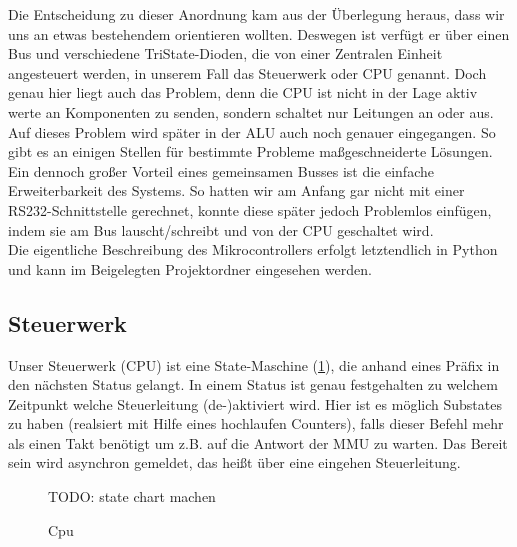 Die Entscheidung zu dieser Anordnung kam aus der Überlegung heraus, dass wir uns an etwas bestehendem orientieren wollten. Deswegen ist verfügt er über einen Bus und verschiedene TriState-Dioden, die von einer Zentralen Einheit angesteuert werden, in unserem Fall das Steuerwerk oder CPU genannt. Doch genau hier liegt auch das Problem, denn die CPU ist nicht in der Lage aktiv werte an Komponenten zu senden, sondern schaltet nur Leitungen an oder aus. Auf dieses Problem wird später in der ALU auch noch genauer eingegangen. So gibt es an einigen Stellen für bestimmte Probleme maßgeschneiderte Lösungen.\\
Ein dennoch großer Vorteil eines gemeinsamen Busses ist die einfache Erweiterbarkeit des Systems. So hatten wir am Anfang gar nicht mit einer RS232-Schnittstelle gerechnet, konnte diese später jedoch Problemlos einfügen, indem sie am Bus lauscht/schreibt und von der CPU geschaltet wird.\\
Die eigentliche Beschreibung des Mikrocontrollers erfolgt letztendlich in Python und kann im Beigelegten Projektordner eingesehen werden.

\subsection{Steuerwerk}
Unser Steuerwerk (CPU) ist eine State-Maschine (\ref{HW:CPU-State}), die anhand eines Präfix in den nächsten Status gelangt. In einem Status ist genau festgehalten zu welchem Zeitpunkt welche Steuerleitung (de-)aktiviert wird. Hier ist es möglich Substates zu haben (realsiert mit Hilfe eines hochlaufen Counters), falls dieser Befehl mehr als einen Takt benötigt um z.B. auf die Antwort der MMU zu warten. Das Bereit sein wird asynchron gemeldet, das heißt über eine eingehen Steuerleitung. 

\begin{figure}[h]
TODO: state chart machen
\caption{\label{HW:CPU-State}Cpu}
\end{figure}

